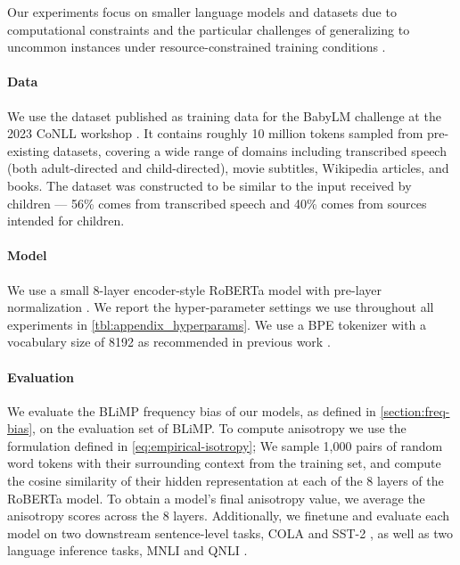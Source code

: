 Our experiments focus on smaller language models and datasets due to computational constraints and the particular challenges of generalizing to uncommon instances under resource-constrained training conditions \citep{warstadt2023babylm1,diehlmartinez2023climb}. 

\paragraph{Data} \label{paragraph:data} We use the dataset published as training data for the BabyLM challenge at the 2023 CoNLL workshop \citep{warstadt2023babylm1}. It contains roughly 10 million tokens sampled from pre-existing datasets, covering a wide range of domains including transcribed speech (both adult-directed and child-directed), movie subtitles, Wikipedia articles, and books. The dataset was constructed to be similar to the input received by children --- 56\% comes from transcribed speech and 40\% comes from sources intended for children.

\paragraph{Model} We use a small 8-layer encoder-style RoBERTa model with pre-layer normalization \cite{huebner2021babyberta}. We report the hyper-parameter settings we use throughout all experiments in \cref{tbl:appendix_hyperparams}. We use a BPE tokenizer \citep{sennrich2016bpe} with a vocabulary size of 8192 as recommended in previous work \cite{diehlmartinez2023climb}. 

\paragraph{Evaluation} We evaluate the BLiMP frequency bias of our models, as defined in \cref{section:freq-bias}, on the evaluation set of BLiMP. To compute anisotropy we use the formulation defined in \cref{eq:empirical-isotropy}; We sample 1,000 pairs of random word tokens with their surrounding context from the training set, and compute the cosine similarity of their hidden representation at each of the 8 layers of the RoBERTa model. To obtain a model's final anisotropy value, we average the anisotropy scores across the 8 layers. Additionally, we finetune and evaluate each model on two downstream sentence-level tasks, COLA \citep{warstadt2019cola} and SST-2 \citep{socher2013sst}, as well as two language inference tasks, MNLI \citep{williams2018mnli} and QNLI \citep{rajpurkar2016squad, wang2018glue}.

